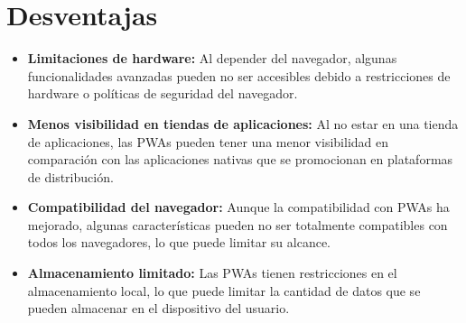 \documentclass{article}
\begin{document}
\section*{Desventajas}
\begin{itemize}
    \item \textbf{Limitaciones de hardware:} Al depender del navegador, algunas funcionalidades avanzadas pueden no ser accesibles debido a restricciones de hardware o políticas de seguridad del navegador.
    \item \textbf{Menos visibilidad en tiendas de aplicaciones:} Al no estar en una tienda de aplicaciones, las PWAs pueden tener una menor visibilidad en comparación con las aplicaciones nativas que se promocionan en plataformas de distribución.
    \item \textbf{Compatibilidad del navegador:} Aunque la compatibilidad con PWAs ha mejorado, algunas características pueden no ser totalmente compatibles con todos los navegadores, lo que puede limitar su alcance.
    \item \textbf{Almacenamiento limitado:} Las PWAs tienen restricciones en el almacenamiento local, lo que puede limitar la cantidad de datos que se pueden almacenar en el dispositivo del usuario.
\end{itemize}
 
\end{document}
